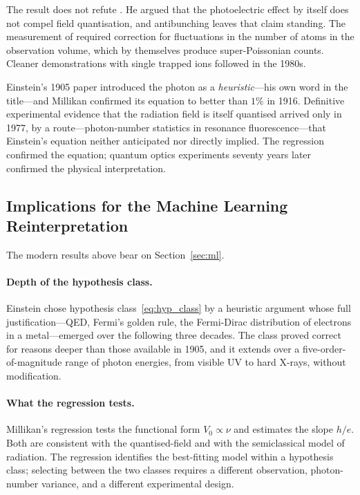 \documentclass[12pt]{article}
\begin{document}
The result does not refute \citeauthor{Lamb1969}.  He argued that the
photoelectric effect by itself does not compel field quantisation, and
antibunching leaves that claim standing.  The measurement of
\citet{Kimble1977} required correction for fluctuations in the number of atoms
in the observation volume, which by themselves produce super-Poissonian
counts.  Cleaner demonstrations with single trapped ions followed in the
1980s.

Einstein's 1905 paper introduced
the photon as a \emph{heuristic}---his own word in the title---and
Millikan confirmed its equation to better than $1\%$ in 1916.  Definitive experimental
evidence that the radiation field is itself quantised arrived only in 1977,
by a route---photon-number statistics in resonance fluorescence---that
Einstein's equation neither anticipated nor directly implied.  The
regression confirmed the equation; quantum optics experiments seventy
years later confirmed the physical interpretation.

\subsection{Implications for the Machine Learning Reinterpretation}
\label{app:ml_implications}

The modern results above bear on Section~\ref{sec:ml}.

\paragraph{Depth of the hypothesis class.}
Einstein chose hypothesis class~\eqref{eq:hyp_class} by a heuristic
argument whose full justification---QED, Fermi's golden rule, the
Fermi-Dirac distribution of electrons in a metal---emerged over the
following three decades.  The class proved correct for reasons deeper
than those available in 1905, and it extends over a five-order-of-magnitude
range of photon energies, from visible UV to hard X-rays, without
modification.

\paragraph{What the regression tests.}
Millikan's regression tests the functional form $V_0 \propto \nu$ and
estimates the slope $h/e$.  Both are consistent with the quantised-field and
with the semiclassical model of radiation.  The regression identifies the
best-fitting model within a hypothesis class; selecting between the two
classes requires a different observation, photon-number variance, and a
different experimental design.
\end{document}
